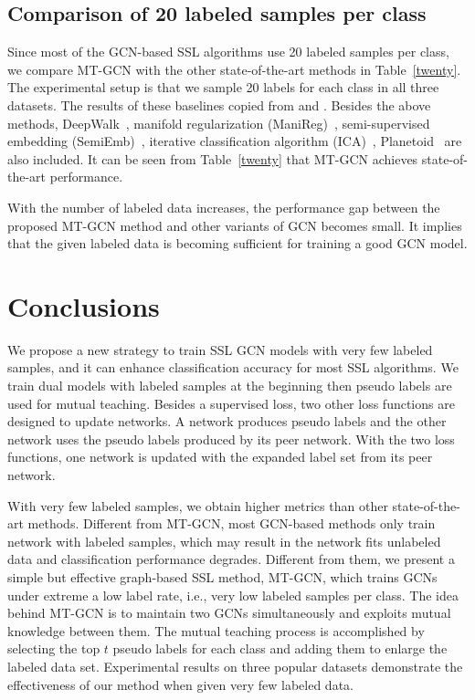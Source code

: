 \documentclass{article}
\begin{document}
\subsection{Comparison of 20 labeled samples per class}
Since most of the GCN-based SSL algorithms use 20 labeled samples per class, we compare MT-GCN with the other state-of-the-art methods in Table~\ref{twenty}. The experimental setup is that we sample 20 labels for each class in all three datasets. The results of these baselines copied from \cite{kipf2016semi} and \cite{li2018deeper}. Besides the above methods, DeepWalk~\cite{perozzi2014deepwalk}, manifold regularization (ManiReg)~\cite{belkin2006manifold}, semi-supervised embedding (SemiEmb)~\cite{weston2012deep}, iterative classification algorithm (ICA)~\cite{sen2008collective}, Planetoid~\cite{yang2016revisiting} are also included. It can be seen from Table~\ref{twenty} that MT-GCN achieves state-of-the-art performance.

With the number of labeled data increases, the performance gap between the proposed MT-GCN method and other variants of GCN becomes small. It implies that the given labeled data is becoming sufficient for training a good GCN model.
\section{Conclusions}\label{Conclusions}
We propose a new strategy to train SSL GCN models with very few labeled samples, and it can enhance classification accuracy for most SSL algorithms. We train dual models with labeled samples at the beginning then pseudo labels are used for mutual teaching. Besides a supervised loss, two other loss functions are designed to update networks. A network produces pseudo labels and the other network uses the pseudo labels produced by its peer network. With the two loss functions, one network is updated with the expanded label set from its peer network.

With very few labeled samples, we obtain higher metrics than other state-of-the-art methods. Different from MT-GCN, most GCN-based methods only train network with labeled samples, which may result in the network fits unlabeled data and classification performance degrades. Different from them, we present a simple but effective graph-based SSL method, MT-GCN, which trains GCNs under extreme a low label rate, i.e., very low labeled samples per class. The idea behind MT-GCN is to maintain two GCNs simultaneously and exploits mutual knowledge between them. The mutual teaching process is accomplished by selecting the top $t$ pseudo labels for each class and adding them to enlarge the labeled data set. Experimental results on three popular datasets demonstrate the effectiveness of our method when given very few labeled data.
\end{document}
